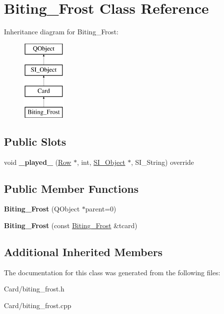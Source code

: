 \hypertarget{class_biting___frost}{}\section{Biting\+\_\+\+Frost Class Reference}
\label{class_biting___frost}
Inheritance diagram for Biting\+\_\+\+Frost\+:\begin{figure}[H]
\begin{center}
\leavevmode
\includegraphics[height=4.000000cm]{class_biting___frost}
\end{center}
\end{figure}
\subsection*{Public Slots}
\begin{DoxyCompactItemize}
\item 
\mbox{\label{class_biting___frost_ac7048a864d92efa0d3d10302d10b12ec}} 
void {\bfseries \+\_\+played\+\_\+} (\hyperlink{class_card_set}{Row} $\ast$, int, \hyperlink{class_s_i___object}{S\+I\+\_\+\+Object} $\ast$, S\+I\+\_\+\+String) override
\end{DoxyCompactItemize}
\subsection*{Public Member Functions}
\begin{DoxyCompactItemize}
\item 
\mbox{\label{class_biting___frost_a0b16cdc12d3a2d214570d8054eb717ce}} 
{\bfseries Biting\+\_\+\+Frost} (Q\+Object $\ast$parent=0)
\item 
\mbox{\label{class_biting___frost_a5d0c57aa47332621d912b1fb4ea7ba9a}} 
{\bfseries Biting\+\_\+\+Frost} (const \hyperlink{class_biting___frost}{Biting\+\_\+\+Frost} \&tcard)
\end{DoxyCompactItemize}
\subsection*{Additional Inherited Members}


The documentation for this class was generated from the following files\+:\begin{DoxyCompactItemize}
\item 
Card/biting\+\_\+frost.\+h\item 
Card/biting\+\_\+frost.\+cpp\end{DoxyCompactItemize}
